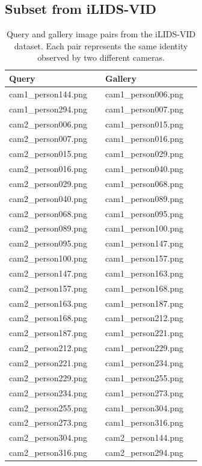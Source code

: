 \subsection{Subset from iLIDS-VID}

\begin{table}[H]
\centering
\renewcommand{\arraystretch}{1.2}
\begin{tabular}{|p{0.45\linewidth}|p{0.45\linewidth}|}
\hline
\rowcolor[HTML]{D8E9F7}
\textbf{Query} & \textbf{Gallery} \\
\hline
cam1\_person144.png & cam1\_person006.png \\
cam1\_person294.png & cam1\_person007.png \\
cam2\_person006.png & cam1\_person015.png \\
cam2\_person007.png & cam1\_person016.png \\
cam2\_person015.png & cam1\_person029.png \\
cam2\_person016.png & cam1\_person040.png \\
cam2\_person029.png & cam1\_person068.png \\
cam2\_person040.png & cam1\_person089.png \\
cam2\_person068.png & cam1\_person095.png \\
cam2\_person089.png & cam1\_person100.png \\
cam2\_person095.png & cam1\_person147.png \\
cam2\_person100.png & cam1\_person157.png \\
cam2\_person147.png & cam1\_person163.png \\
cam2\_person157.png & cam1\_person168.png \\
cam2\_person163.png & cam1\_person187.png \\
cam2\_person168.png & cam1\_person212.png \\
cam2\_person187.png & cam1\_person221.png \\
cam2\_person212.png & cam1\_person229.png \\
cam2\_person221.png & cam1\_person234.png \\
cam2\_person229.png & cam1\_person255.png \\
cam2\_person234.png & cam1\_person273.png \\
cam2\_person255.png & cam1\_person304.png \\
cam2\_person273.png & cam1\_person316.png \\
cam2\_person304.png & cam2\_person144.png \\
cam2\_person316.png & cam2\_person294.png \\
\hline
\end{tabular}
\caption{Query and gallery image pairs from the iLIDS-VID dataset. Each pair represents the same identity observed by two different cameras.}
\label{tab:custom_camera_pairs}
\end{table}

